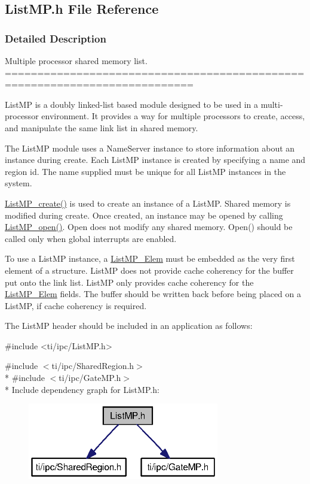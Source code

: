 \subsection{List\-M\-P.\-h File Reference}
\label{_list_m_p_8h}


\subsubsection{Detailed Description}
Multiple processor shared memory list. ===========================================================================

List\-M\-P is a doubly linked-\/list based module designed to be used in a multi-\/processor environment. It provides a way for multiple processors to create, access, and manipulate the same link list in shared memory.

The List\-M\-P module uses a Name\-Server instance to store information about an instance during create. Each List\-M\-P instance is created by specifying a name and region id. The name supplied must be unique for all List\-M\-P instances in the system.

\hyperlink{_list_m_p_8h_a71fdd7f30d377065fb70dd095a186d3e}{List\-M\-P\-\_\-create()} is used to create an instance of a List\-M\-P. Shared memory is modified during create. Once created, an instance may be opened by calling \hyperlink{_list_m_p_8h_aeae2eea832b0f2f8cf45ea297bb1c7d0}{List\-M\-P\-\_\-open()}. Open does not modify any shared memory. Open() should be called only when global interrupts are enabled.

To use a List\-M\-P instance, a \hyperlink{struct_list_m_p___elem}{List\-M\-P\-\_\-\-Elem} must be embedded as the very first element of a structure. List\-M\-P does not provide cache coherency for the buffer put onto the link list. List\-M\-P only provides cache coherency for the \hyperlink{struct_list_m_p___elem}{List\-M\-P\-\_\-\-Elem} fields. The buffer should be written back before being placed on a List\-M\-P, if cache coherency is required.

The List\-M\-P header should be included in an application as follows\-: 
\begin{DoxyCode}
\textcolor{preprocessor}{    #include <ti/ipc/ListMP.h>}
\end{DoxyCode}
 

{\ttfamily \#include $<$ti/ipc/\-Shared\-Region.\-h$>$}\\*
{\ttfamily \#include $<$ti/ipc/\-Gate\-M\-P.\-h$>$}\\*
Include dependency graph for List\-M\-P.\-h\-:
\nopagebreak
\begin{figure}[H]
\begin{center}
\leavevmode
\includegraphics[width=237pt]{_list_m_p_8h__incl}
\end{center}
\end{figure}
